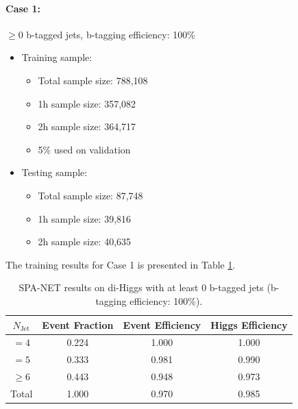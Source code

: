 \documentclass[12pt]{article}
\begin{document}
		\paragraph{Case 1:} $\ge 0$ b-tagged jets, b-tagging efficiency: 100\% 
		\begin{itemize}
			\item Training sample:
			\begin{itemize}
				\item Total sample size: 788,108
				\item 1h sample size: 357,082
				\item 2h sample size: 364,717
				\item 5\% used on validation
			\end{itemize}
			\item Testing sample: 
				\begin{itemize}
					\item Total sample size: 87,748
					\item 1h sample size: 39,816
					\item 2h sample size: 40,635
				\end{itemize}
		\end{itemize}
		The training results for Case 1 is presented in Table \ref{tab:SPANet_0btag_100}.
		\begin{table}[htpb]
			\centering
			\caption{SPA-NET results on di-Higgs with at least 0 b-tagged jets (b-tagging efficiency: 100\%).}
			\label{tab:SPANet_0btag_100}
			\begin{tabular}{c|c|cc}
				$N_\text{Jet}$ & Event Fraction & Event Efficiency & Higgs Efficiency \\
				\hline
				$=4$	  &   0.224             &    1.000              &    1.000             \\
				$=5$	  &   0.333             &    0.981              &    0.990             \\
				$\ge 6$	  &   0.443             &    0.948              &    0.973             \\
				Total	  &   1.000             &    0.970              &    0.985             \\
			\end{tabular}
		\end{table}
\end{document}

